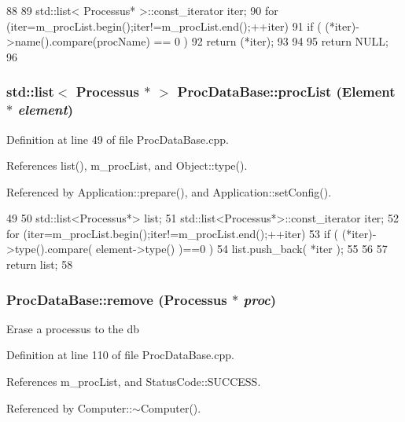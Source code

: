 \begin{DoxyCode}
88                                                         {
89   std::list< Processus* >::const_iterator iter;
90   for (iter=m_procList.begin();iter!=m_procList.end();++iter){
91     if ( (*iter)->name().compare(procName) == 0 ) {
92       return (*iter);
93     }        
94   }
95   return NULL;
96 }
\end{DoxyCode}
\hypertarget{classProcDataBase_a8145de34e9857f3f6eebd2572740f198}{
\subsubsection[{procList}]{\setlength{\rightskip}{0pt plus 5cm}std::list$<$ {\bf Processus} $\ast$ $>$ ProcDataBase::procList ({\bf Element} $\ast$ {\em element})}}
\label{classProcDataBase_a8145de34e9857f3f6eebd2572740f198}


Definition at line 49 of file ProcDataBase.cpp.

References list(), m\_\-procList, and Object::type().

Referenced by Application::prepare(), and Application::setConfig().


\begin{DoxyCode}
49                                                               {
50   std::list<Processus*> list;
51   std::list<Processus*>::const_iterator iter;
52   for (iter=m_procList.begin();iter!=m_procList.end();++iter){
53     if ( (*iter)->type().compare( element->type() )==0 ){
54       list.push_back( *iter );        
55     }
56   }
57   return list;
58 }
\end{DoxyCode}
\hypertarget{classProcDataBase_a0413976bac8f233b31eab6d7a83866b9}{
\subsubsection[{remove}]{ ProcDataBase::remove ({\bf Processus} $\ast$ {\em proc})}}
\label{classProcDataBase_a0413976bac8f233b31eab6d7a83866b9}
Erase a processus to the db 

Definition at line 110 of file ProcDataBase.cpp.

References m\_\-procList, and StatusCode::SUCCESS.

Referenced by Computer::$\sim$Computer().


